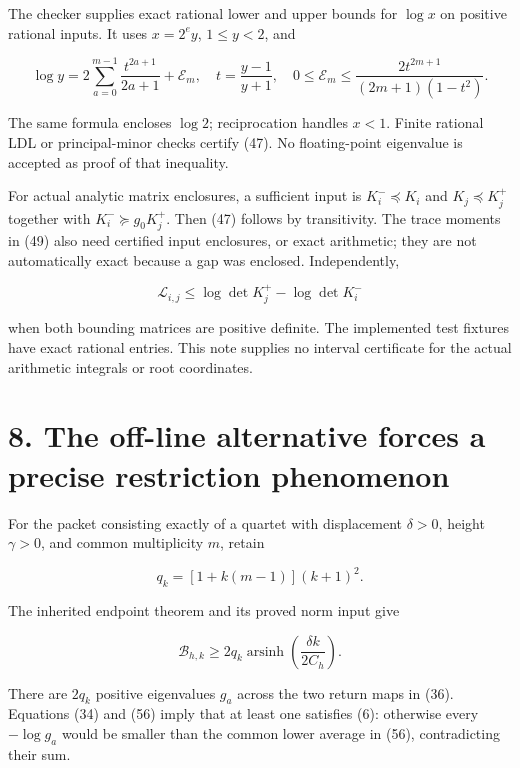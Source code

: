 \documentclass[
  11pt,
]{article}
\begin{document}
The checker supplies exact rational lower and upper bounds for
\(\log x\) on positive rational inputs. It uses \(x=2^e y\),
\(1\le y<2\), and

\[
 \log y=2\sum_{a=0}^{m-1}\frac{t^{2a+1}}{2a+1}+\mathcal E_m,
 \quad t=\frac{y-1}{y+1},\quad
 0\le\mathcal E_m\le
 \frac{2t^{2m+1}}{(2m+1)(1-t^2)}.                                 \tag{53}
\]

The same formula encloses \(\log2\); reciprocation handles \(x<1\).
Finite rational LDL or principal-minor checks certify (47). No
floating-point eigenvalue is accepted as proof of that inequality.

For actual analytic matrix enclosures, a sufficient input is
\(K_i^-\preceq K_i\) and \(K_j\preceq K_j^+\) together with
\(K_i^-\succeq g_0K_j^+\). Then (47) follows by transitivity. The trace
moments in (49) also need certified input enclosures, or exact
arithmetic; they are not automatically exact because a gap was enclosed.
Independently,

\[
 \mathcal L_{i,j}\le\log\det K_j^+-\log\det K_i^-
                                                                    \tag{54}
\]

when both bounding matrices are positive definite. The implemented test
fixtures have exact rational entries. This note supplies no interval
certificate for the actual arithmetic integrals or root coordinates.

\section{8. The off-line alternative forces a precise restriction
phenomenon}\label{the-off-line-alternative-forces-a-precise-restriction-phenomenon}

For the packet consisting exactly of a quartet with displacement
\(\delta>0\), height \(\gamma>0\), and common multiplicity \(m\), retain

\[
 q_k=[1+k(m-1)](k+1)^2.                                           \tag{55}
\]

The inherited endpoint theorem and its proved norm input give

\[
 \mathcal B_{h,k}\ge
 2q_k\operatorname{arsinh}\!\left(\frac{\delta k}{2C_h}\right).
                                                                    \tag{56}
\]

There are \(2q_k\) positive eigenvalues \(g_a\) across the two return
maps in (36). Equations (34) and (56) imply that at least one satisfies
(6): otherwise every \(-\log g_a\) would be smaller than the common
lower average in (56), contradicting their sum.
\end{document}
